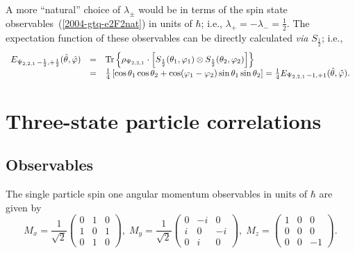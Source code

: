 \documentclass[pra,amsfonts,showpacs,showkeys,preprint]{revtex4}
\begin{document}
A more ``natural'' choice of $\lambda_\pm$ would be in terms of the spin state observables~(\ref{2004-gtq-e2F2nat}) in units of $\hbar$;
i.e., $  \lambda_+ = -  \lambda_- =\frac{1}{2}$.
The expectation function of  these observables can be directly calculated {\it via} $S_{\frac{1}{2}}$; i.e.,
\begin{equation}
\begin{array}{rcl}
E_{{ \Psi_{2,2,1}}\,-\frac{1}{2},+ \frac{1}{2} } ({\hat \theta},{\hat \varphi} )&=&
{\rm Tr}\left\{ \rho_{ \Psi_{2,2,1}} \cdot \left[ S_{\frac{1}{2}}(\theta_1,\varphi_1) \otimes S_{\frac{1}{2}}(\theta_2,\varphi_2)\right]\right\} \\
&=&
\frac{1}{4} \left[\cos
    \theta_1  \cos  \theta_2 +\cos ( \varphi_1 - \varphi_2 ) \sin \theta_1  \sin  \theta_2 \right]
= \frac{1}{4}E_{{ \Psi_{2,2,1}}\,-1 ,+1 } ({\hat \theta},{\hat \varphi} )
.
\label{2009-gtq-sso2}
\end{array}
\end{equation}



\section{Three-state particle correlations}

\subsection{Observables}
The single particle  spin one angular momentum observables in units of $\hbar$ are given by~\cite{schiff-55}
\begin{equation}
M_x=
\frac{1}{\sqrt{2}}
\left(
\begin{array}{cccccccccc}
0&1&0\\
1&0&1\\
0&1&0
\end{array}
\right),
\;
M_y=
\frac{1}{\sqrt{2}}
\left(
\begin{array}{cccccccccc}
0&-i&0\\
i&0&-i\\
0&i&0
\end{array}
\right),
\;
M_z=
\left(
\begin{array}{cccccccccc}
1&0&0\\
0&0&0\\
0&0&-1
\end{array}
\right).
\end{equation}
\end{document}
